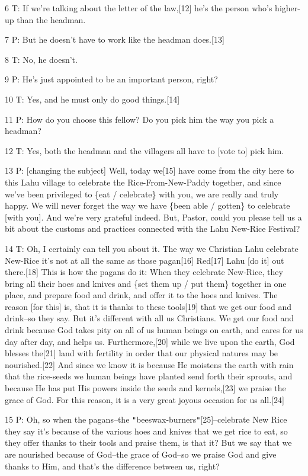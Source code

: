 {6 T: If we're talking about the letter of the law,[12] he's the person
who's higher-up than the headman.}

{7 P: But he doesn't have to work like the headman does.[13]}

{8 T: No, he doesn't. }

{9 P: He's just appointed to be an important person, right?}

{10 T: Yes, and he must only do good things.[14]}

{11 P: How do you choose this fellow? Do you pick him the way you pick a
headman?}

{12 T: Yes, both the headman and the villagers all have to [vote to] pick
him.}

{13 P: [changing the subject] Well, today we[15] have come from the city
here to this Lahu village to celebrate the Rice-From-New-Paddy together, and since
we've been privileged to \{eat / celebrate\} with you, we are really and truly
happy. We will never forget the way we have \{been able / gotten\} to celebrate
[with you]. And we're very grateful indeed. But, Pastor, could you please tell
us a bit about the customs and practices connected with the Lahu New-Rice Festival?
}

{14 T: Oh, I certainly can tell you about it. The way we Christian Lahu
celebrate New-Rice it's not at all the same as those pagan[16] Red[17] Lahu [do
it] out there.[18] This is how the pagans do it: When they celebrate New-Rice,
they bring all their hoes and knives and \{set them up / put them\} together in
one place, and prepare food and drink, and offer it to the hoes and knives. The
reason [for this] is, that it is thanks to these tools[19] that we get our food
and drink--so they say. But it's different with all us Christians. We get our food
and drink because God takes pity on all of us human beings on earth, and cares
for us day after day, and helps us. Furthermore,[20] while we live upon the earth,
God blesses the[21] land with fertility in order that our physical natures may
be nourished.[22] And since we know it is because He moistens the earth with rain
that the rice-seeds we human beings have planted send forth their sprouts, and
because He has put His powers inside the seeds and kernels,[23] we praise the grace
of God. For this reason, it is a very great joyous occasion for us all.[24]}

{15 P: Oh, so when the pagans--the \texttt{"}beeswax-burners\texttt{"}[25]--celebrate
New Rice they say it's because of the various hoes and knives that we get rice
to eat, so they offer thanks to their tools and praise them, is that it? But we
say that we are nourished because of God--the grace of God--so we praise God and
give thanks to Him, and that's the difference between us, right? }

